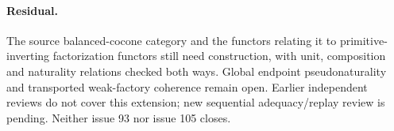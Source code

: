 \documentclass{article}
\begin{document}
\paragraph{Residual.} The source balanced-cocone category and the functors relating it to primitive-inverting factorization functors still need construction, with unit, composition and naturality relations checked both ways. Global endpoint pseudonaturality and transported weak-factory coherence remain open. Earlier independent reviews do not cover this extension; new sequential adequacy/replay review is pending. Neither issue 93 nor issue 105 closes.
\end{document}
